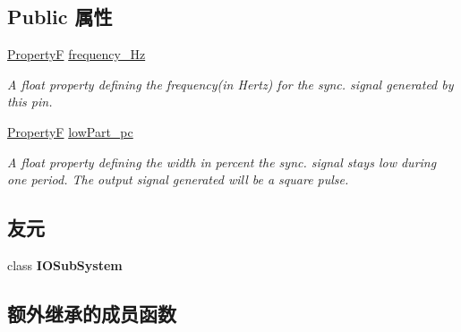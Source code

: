 \subsection*{Public 属性}
\begin{DoxyCompactItemize}
\item 
\hypertarget{classmv_i_m_p_a_c_t_1_1acquire_1_1_sync_output_af2b6f87408372fde91f190f8ef312e45}{\hyperlink{group___common_interface_gaf54865fe5a3d5cfd15f9a111b40d09f9}{Property\+F} \hyperlink{classmv_i_m_p_a_c_t_1_1acquire_1_1_sync_output_af2b6f87408372fde91f190f8ef312e45}{frequency\+\_\+\+Hz}}\label{classmv_i_m_p_a_c_t_1_1acquire_1_1_sync_output_af2b6f87408372fde91f190f8ef312e45}

\begin{DoxyCompactList}\small\item\em A float property defining the frequency(in Hertz) for the sync. signal generated by this pin. \end{DoxyCompactList}\item 
\hypertarget{classmv_i_m_p_a_c_t_1_1acquire_1_1_sync_output_a2fe2b394ad27ffcaf5c27f183384e6cb}{\hyperlink{group___common_interface_gaf54865fe5a3d5cfd15f9a111b40d09f9}{Property\+F} \hyperlink{classmv_i_m_p_a_c_t_1_1acquire_1_1_sync_output_a2fe2b394ad27ffcaf5c27f183384e6cb}{low\+Part\+\_\+pc}}\label{classmv_i_m_p_a_c_t_1_1acquire_1_1_sync_output_a2fe2b394ad27ffcaf5c27f183384e6cb}

\begin{DoxyCompactList}\small\item\em A float property defining the width in percent the sync. signal stays low during one period. The output signal generated will be a square pulse. \end{DoxyCompactList}\end{DoxyCompactItemize}
\subsection*{友元}
\begin{DoxyCompactItemize}
\item 
\hypertarget{classmv_i_m_p_a_c_t_1_1acquire_1_1_sync_output_a3a1008d5502332da6f64a8940aa3a007}{class {\bfseries I\+O\+Sub\+System}}\label{classmv_i_m_p_a_c_t_1_1acquire_1_1_sync_output_a3a1008d5502332da6f64a8940aa3a007}

\end{DoxyCompactItemize}
\subsection*{额外继承的成员函数}



